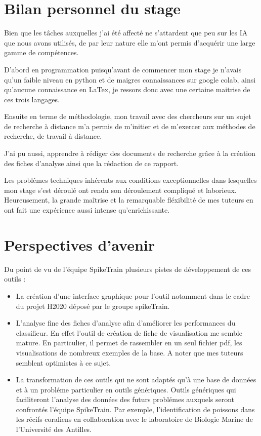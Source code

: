 \section{Bilan personnel du stage}

Bien que les tâches auxquelles j'ai été affecté ne s'attardent que peu sur les
IA que nous avons utilisés, de par leur nature elle m'ont permis d'acquérir une
large gamme de compétences.

D'abord en programmation puisqu'avant de commencer mon stage je n'avais qu'un faible niveau en python et de maigres connaissances sur google colab, ainsi qu'aucune connaissance en LaTex, je ressors donc avec une certaine maitrise de ces trois langages.

Ensuite en terme de méthodologie, mon travail avec des chercheurs sur un sujet de recherche à distance m'a permis de m'initier et de m'exercer aux méthodes de recherche, de travail à distance.

J'ai pu aussi, apprendre à rédiger des documents de recherche grâce à la création des fiches d'analyse ainsi que la rédaction de ce rapport.

Les problémes techniques inhérents aux conditions exceptionnelles dans lesquelles mon stage s'est déroulé ont rendu son déroulement compliqué et laborieux.
Heureusement, la grande maîtrise et la remarquable fléxibilité de mes tuteurs en ont fait une expérience aussi intense qu'enrichissante.

\section{Perspectives d'avenir}

Du point de vu de l'équipe SpikeTrain plusieurs pistes de développement de ces outils :

\begin{itemize}

\item La création d'une interface graphique pour l'outil notamment dans le cadre du projet H2020 déposé par le groupe spikeTrain.

\item L'analyse fine des fiches d'analyse afin d'améliorer les performances du classifieur. En effet l'outil de création de fiche de visualisation me semble mature.
En particulier, il permet de rassembler en un seul fichier pdf, les visualisations de nombreux exemples de la base.
A noter que mes tuteurs semblent optimistes à ce sujet.

\item La transformation de ces outils qui ne sont adaptés qu'à une base de données et à un probléme particulier en outils génériques.
Outils génériques qui faciliteront l'analyse des données des futurs problémes auxquels seront confrontés l'équipe SpikeTrain. Par exemple, l'identification de
poissons dans les récifs coraliens en collaboration avec le laboratoire de
Biologie Marine de l'Université des Antilles.

\end{itemize}

